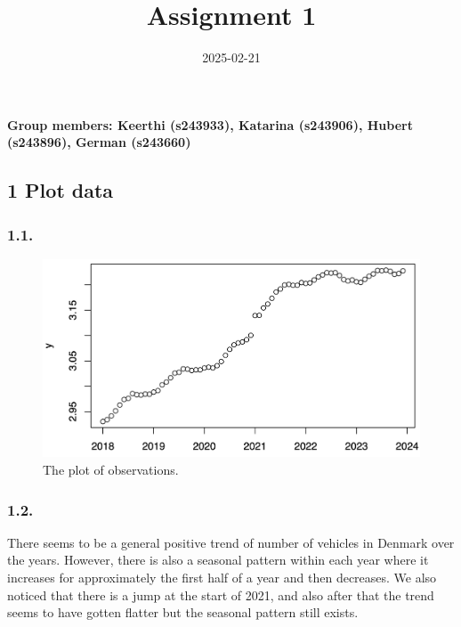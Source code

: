 \documentclass[
]{article}
\title{Assignment 1}
\author{}
\date{\vspace{-2.5em}2025-02-21}
\begin{document}
\maketitle

\paragraph{Group members: Keerthi (s243933), Katarina (s243906), Hubert
(s243896), German
(s243660)}\label{group-members-keerthi-s243933-katarina-s243906-hubert-s243896-german-s243660}

\subsection{1 Plot data}\label{plot-data}

\subsubsection{1.1.}\label{section}

\begin{figure}

{\centering \includegraphics[width=0.7\linewidth]{plots/dtrain_plot} 

}

\caption{The plot of observations.}\label{fig:unnamed-chunk-1}
\end{figure}

\subsubsection{1.2.}\label{section-1}

There seems to be a general positive trend of number of vehicles in
Denmark over the years. However, there is also a seasonal pattern within
each year where it increases for approximately the first half of a year
and then decreases. We also noticed that there is a jump at the start of
2021, and also after that the trend seems to have gotten flatter but the
seasonal pattern still exists.
\end{document}
